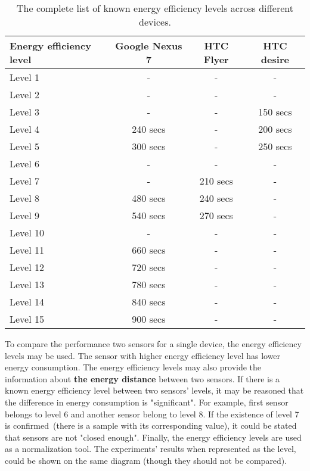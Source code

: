 \begin{center}
	\begin{table}
    \begin{tabular}{| l | c | c | c |}
    \hline
      Energy efficiency level & Google Nexus 7 & HTC Flyer & HTC desire \\ \hline
    Level 1 & -& - &  -\\ \hline
  	Level 2 & - & - & -\\ \hline
  	Level 3 & - & - & 150 secs\\ \hline
    Level 4 & 240 secs & - & 200 secs\\ \hline
    Level 5 & 300 secs & - & 250 secs \\ \hline
    Level 6 & - & - & - \\\hline
    Level 7 & - & 210 secs & - \\ \hline
    Level 8 & 480 secs & 240  secs & - \\ \hline
    Level 9 & 540 secs & 270 secs & - \\ \hline
    Level 10 & - & - & - \\ \hline
    Level 11 & 660 secs & - & - \\ \hline
    Level 12 & 720 secs & - & -\\ \hline
    Level 13 & 780 secs & - & - \\ \hline
    Level 14 & 840 secs & - & -\\ \hline
    Level 15 & 900 secs & -& -\\ \hline
    \end{tabular}
    \caption{The complete list of known energy efficiency levels across different devices.}
	\label{table:energy_efficiency_levels}
	\end{table}
\end{center}		
	
To compare the performance two sensors for a single device, the energy efficiency levels may be used. The sensor with higher energy efficiency level has lower energy consumption. The energy efficiency levels may also provide the information about \textbf{the energy distance} between two sensors. If there is a known energy efficiency level between two sensors' levels, it may be reasoned that the difference in energy consumption is "significant". For example, first sensor belongs to level 6 and another sensor belong to level 8. If the existence of level 7 is confirmed\ (there is a sample with its corresponding value), it could be stated that sensors are not "closed enough". Finally, the energy efficiency levels are used as a normalization tool. The experiments' results when represented as the level, could be shown on the same diagram (though they should not be compared). 

